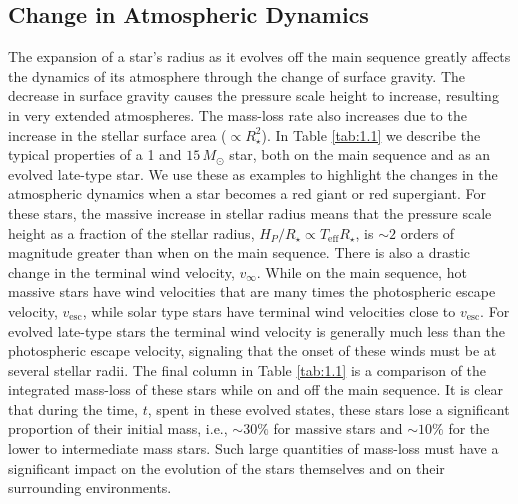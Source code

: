 \subsection{Change in Atmospheric Dynamics}\label{sec:1.5.1}
The expansion of a star's radius as it evolves off the main sequence greatly affects the dynamics of its atmosphere through the change of surface gravity. The decrease in surface gravity causes the pressure scale height to increase, resulting in very extended atmospheres. The mass-loss rate also increases due to the increase in the stellar surface area ($\propto R_{\star}^2$). In Table \ref{tab:1.1} we describe the typical properties of a 1 and $15\,M_{\odot}$ star, both on the main sequence and as an evolved late-type star. We use these as examples to highlight the changes in the atmospheric dynamics when a star becomes a red giant or red supergiant. For these stars, the massive increase in stellar radius means that the pressure scale height as a fraction of the stellar radius, $H_{P}/R_{\star} \propto T_{\mathrm{eff}}R_{\star}$, is $\sim 2$ orders of magnitude greater than when on the main sequence. There is also a drastic change in the terminal wind velocity, $v_{\infty}$. While on the main sequence, hot massive stars have wind velocities that are many times the photospheric escape velocity, $v_{\mathrm{esc}}$, while solar type stars have terminal wind velocities close to $v_{\mathrm{esc}}$. For evolved late-type stars the terminal wind velocity is generally much less than the photospheric escape velocity, signaling that the onset of these winds must be at several stellar radii. The final column in Table \ref{tab:1.1} is a comparison of the integrated mass-loss of these stars while on and off the main sequence. It is clear that during the time, $t$, spent in these evolved states, these stars lose a significant proportion of their initial mass, i.e., $\sim 30\%$ for massive stars and $\sim 10\%$ for the lower to intermediate mass stars. Such large quantities of mass-loss must have a significant impact on the evolution of the stars themselves and on their surrounding environments.



